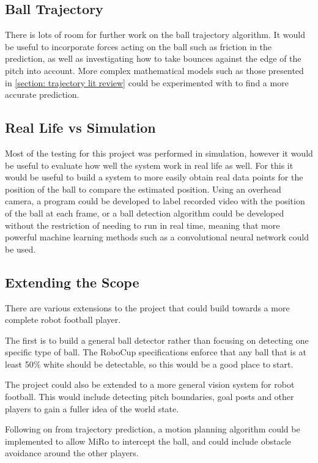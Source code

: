 \subsection{Ball Trajectory}

There is lots of room for further work on the ball trajectory algorithm. It would be useful to incorporate forces acting on the ball such as friction in the prediction, as well as investigating how to take bounces against the edge of the pitch into account. More complex mathematical models such as those presented in \ref{section: trajectory lit review} could be experimented with to find a more accurate prediction.

\subsection{Real Life vs Simulation}

Most of the testing for this project was performed in simulation, however it would be useful to evaluate how well the system work in real life as well. For this it would be useful to build a system to more easily obtain real data points for the position of the ball to compare the estimated position. Using an overhead camera, a program could be developed to label recorded video with the position of the ball at each frame, or a ball detection algorithm could be developed without the restriction of needing to run in real time, meaning that more powerful machine learning methods such as a convolutional neural network could be used. 

\subsection{Extending the Scope}

There are various extensions to the project that could build towards a more complete robot football player. 

The first is to build a general ball detector rather than focusing on detecting one specific type of ball. The RoboCup specifications enforce that any ball that is at least 50\% white should be detectable, so this would be a good place to start.

The project could also be extended to a more general vision system for robot football. This would include detecting pitch boundaries, goal posts and other players to gain a fuller idea of the world state. 

Following on from trajectory prediction, a motion planning algorithm could be implemented to allow MiRo to intercept the ball, and could include obstacle avoidance around the other players. 
